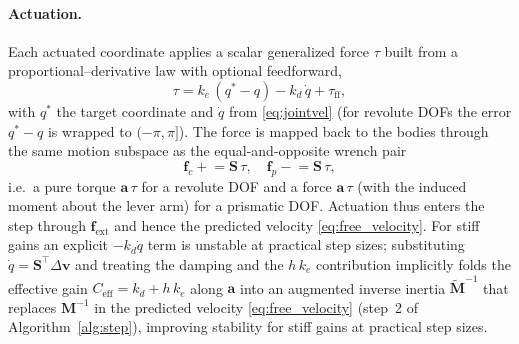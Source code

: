\documentclass{article}
\newcommand{\M}{\mathbf{M}}
\newcommand{\vv}{\mathbf{v}}
\newcommand{\fext}{\mathbf{f}_{\mathrm{ext}}}
\theoremstyle{plain}
\theoremstyle{definition}
\begin{document}
\paragraph{Actuation.} Each actuated coordinate applies a scalar generalized
force $\tau$ built from a proportional--derivative law with optional feedforward,
\begin{equation}
\tau = k_e\,(q^{*}-q) - k_d\,\dot q + \tau_{\mathrm{ff}},
\label{eq:pd}
\end{equation}
with $q^{*}$ the target coordinate and $\dot q$ from \eqref{eq:jointvel} (for
revolute DOFs the error $q^{*}-q$ is wrapped to $(-\pi,\pi]$). The force is mapped
back to the bodies through the same motion subspace as the equal-and-opposite
wrench pair
\begin{equation}
\mathbf f_c \mathrel{+}= \mathbf S\,\tau,\quad \mathbf f_p \mathrel{-}= \mathbf S\,\tau,
\label{eq:act_wrench}
\end{equation}
i.e.\ a pure torque $\mathbf a\,\tau$ for a revolute DOF and a force $\mathbf a\,\tau$
(with the induced moment about the lever arm) for a prismatic DOF. Actuation thus
enters the step through $\fext$ and hence the predicted velocity
\eqref{eq:free_velocity}. For stiff gains an explicit $-k_d\dot q$ term is unstable
at practical step sizes; substituting $\dot q=\mathbf S^{\top}\Delta\vv$ and
treating the damping and the $h\,k_e$ contribution implicitly folds the effective
gain $C_{\mathrm{eff}}=k_d+h\,k_e$ along $\mathbf a$ into an augmented inverse
inertia $\widetilde{\M}^{-1}$ that replaces $\M^{-1}$ in the predicted velocity
\eqref{eq:free_velocity} (step~2 of Algorithm~\ref{alg:step}), improving
stability for stiff gains at practical step sizes.
\end{document}

